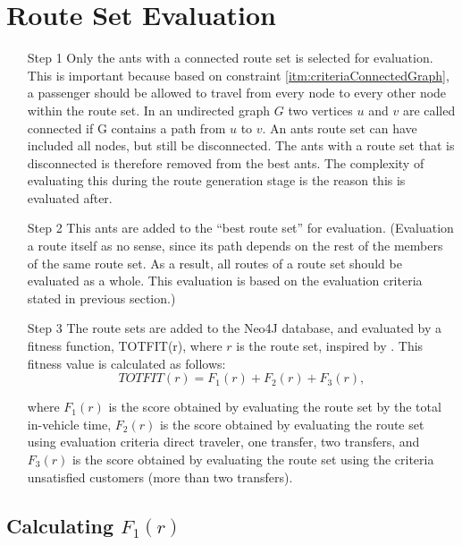 \section{Route Set Evaluation}

\begin{itemize}
\item[Step 1] Only the ants with a connected route set is selected for evaluation. This is important because based on constraint \ref{itm:criteriaConnectedGraph}, a passenger should be allowed to travel from every node to every other node within the route set. In an undirected graph $G$ two vertices $u$ and $v$ are called connected if G contains a path from $u$ to $v$. An ants route set can have included all nodes, but still be disconnected. The ants with a route set that is disconnected is therefore removed from the best ants. The complexity of evaluating this during the route generation stage is the reason this is evaluated after. 

\item[Step 2] This ants are added to the ``best route set'' for evaluation. (Evaluation a route itself as no sense, since its path depends on the rest of the members of the same route set. As a result, all routes of a route set should be evaluated as a whole. This evaluation is based on the evaluation criteria stated in previous section.)

\item [Step 3]\label{itm:TOTFIT} The route sets are added to the Neo4J database, and evaluated by a fitness function, TOTFIT(r), where $r$ is the route set, inspired by \citep{kechagiopoulos14}.
This fitness value is calculated as follows:
$$ TOTFIT(r) = F_{1}(r) + F_{2}(r) + F_{3}(r), $$

where $ F_{1}(r)$ is the score obtained by evaluating the route set by the total in-vehicle time, $ F_{2}(r)$ is the score obtained by evaluating the route set using evaluation criteria direct traveler, one transfer, two transfers, and $ F_{3}(r)$ is the score obtained by evaluating the route set using the criteria unsatisfied customers (more than two transfers). 
\end{itemize}

\subsection{Calculating $F_{1}(r)$}

